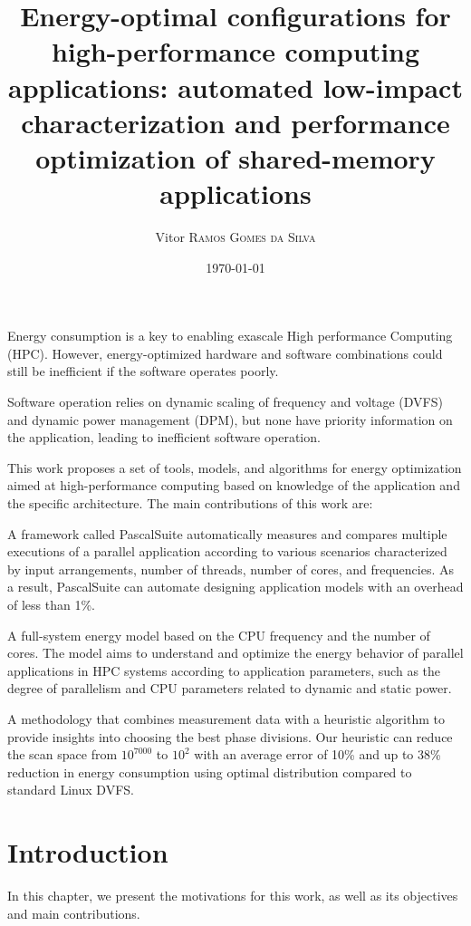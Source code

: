 \documentclass[
papersize=a4,
pagelayout=default,
fontname=latinmodern,
fontsize=11pt,
twoside,
final,
faculty=fpms,
]{umons-Thesis}
\author{Vitor \textsc{Ramos Gomes da Silva}}
\date{\today}
\title{Energy-optimal configurations for high-performance computing applications: automated low-impact characterization and performance optimization of shared-memory applications}
\begin{document}
	
	\umonsThesisTitlePage
	
	
	\frontmatter
	
	\begin{umonsThesisAbstract}
		Energy consumption is a key to enabling exascale High performance Computing (HPC). However, energy-optimized hardware and software combinations could still be inefficient if the software operates poorly. 
		
		Software operation relies on dynamic scaling of frequency and voltage (DVFS) and dynamic power management (DPM), but none have priority information on the application, leading to inefficient software operation. 
		
		This work proposes a set of tools, models, and algorithms for energy optimization aimed at high-performance computing based on knowledge of the application and the specific architecture. The main contributions of this work are:
		
		A framework called PascalSuite automatically measures and compares multiple executions of a parallel application according to various scenarios characterized by input arrangements, number of threads, number of cores, and frequencies. As a result, PascalSuite can automate designing application models with an overhead of less than 1\%.
		
		A full-system energy model based on the CPU frequency and the number of cores. The model aims to understand and optimize the energy behavior of parallel applications in HPC systems according to application parameters, such as the degree of parallelism and CPU parameters related to dynamic and static power.
		
		A methodology that combines measurement data with a heuristic algorithm to provide insights into choosing the best phase divisions. Our heuristic can reduce the scan space from $10^{7000}$ to $10^2$ with an average error of 10\% and up to 38\% reduction in energy consumption using optimal distribution compared to standard Linux DVFS.
	\end{umonsThesisAbstract}
	
	
	\tableofcontents*
	\listoffigures*
	\listoftables*
	
	
	\mainmatter
	
	\chapter{Introduction} \label{chapter:introduction}
	In this chapter, we present the motivations for this work, as well as its objectives and main contributions.
	
	
\end{document}
